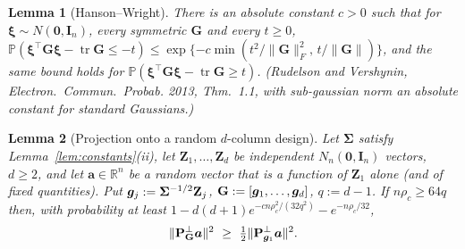 \documentclass[11pt]{article}
\newtheorem{lemma}{Lemma}
\theoremstyle{definition}
\newcommand{\bZ}{\mathbf{Z}}
\newcommand{\bI}{\mathbf{I}}
\newcommand{\bzero}{\mathbf{0}}
\newcommand{\bSig}{\boldsymbol{\Sigma}}
\newcommand{\Prob}{\mathbb{P}}
\newcommand{\tr}{\operatorname{tr}}
\begin{document}
\begin{lemma}[Hanson--Wright]\label{lem:hw}
There is an absolute constant $c>0$ such that for $\bm\xi\sim N(\bzero,\bI_n)$, every symmetric $\mathbf G$ and every $t\ge0$,
$\Prob(\bm\xi^\top\mathbf G\bm\xi-\tr\mathbf G\le-t)\le\exp\{-c\min(t^2/\|\mathbf G\|_F^2,\,t/\|\mathbf G\|)\}$, and the same bound holds for $\Prob(\bm\xi^\top\mathbf G\bm\xi-\tr\mathbf G\ge t)$. (Rudelson and Vershynin, \emph{Electron.\ Commun.\ Probab.} 2013, Thm.~1.1, with sub-gaussian norm an absolute constant for standard Gaussians.)
\end{lemma}

\begin{lemma}[Projection onto a random $d$-column design]\label{lem:proj}
Let $\bSig$ satisfy Lemma~\ref{lem:constants}(ii), let $\bZ_1,\dots,\bZ_d$ be independent $N_n(\bzero,\bI_n)$ vectors, $d\ge2$, and let $\bm a\in\mathbb R^n$ be a random vector that is a function of $\bZ_1$ alone (and of fixed quantities). Put $\bg_j:=\bSig^{-1/2}\bZ_j$, $\mathbf G:=[\bm{g}_1,\dots,\bm{g}_d]$, $q:=d-1$. If $n\rho_c\ge64q$ then, with probability at least $1-d(d+1)e^{-cn\rho_c^2/(32q^2)}-e^{-n\rho_c/32}$,
\[
\|\mathbf P^\perp_{\mathbf G}\bm a\|^2\ \ge\ \tfrac12\|\mathbf P^\perp_{\bg_1}\bm a\|^2 .
\]
\end{lemma}
\end{document}
